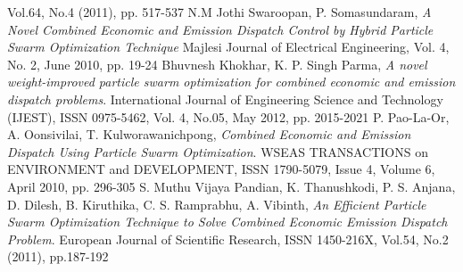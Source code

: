 \documentclass[twosided, 10pt, a4paper]{article}
\begin{document}
\begin{thebibliography}{9}
Vol.64, No.4 (2011), pp. 517-537
N.M Jothi Swaroopan, P. Somasundaram,
\emph{A Novel Combined Economic and Emission Dispatch Control by Hybrid Particle Swarm Optimization Technique}
Majlesi Journal of Electrical Engineering, 
Vol. 4, No. 2, June 2010, pp. 19-24
Bhuvnesh Khokhar, K. P. Singh Parma,
\emph{A novel weight-improved particle swarm optimization for combined economic and emission dispatch problems}.
International Journal of Engineering Science and Technology (IJEST), ISSN 0975-5462,
Vol. 4,  No.05, May 2012, pp. 2015-2021
P. Pao-La-Or, A. Oonsivilai, T. Kulworawanichpong,
\emph{Combined Economic and Emission Dispatch Using Particle Swarm Optimization}.
WSEAS TRANSACTIONS on ENVIRONMENT and DEVELOPMENT, ISSN 1790-5079,
Issue 4, Volume 6, April 2010, pp. 296-305
S. Muthu Vijaya Pandian, K. Thanushkodi, P. S. Anjana, D. Dilesh, B. Kiruthika, C. S. Ramprabhu, A. Vibinth,
\emph{An Efficient Particle Swarm Optimization Technique to Solve Combined Economic Emission Dispatch Problem}.
European Journal of Scientific Research, ISSN 1450-216X,
Vol.54, No.2 (2011), pp.187-192
\end{thebibliography}
\end{document}
